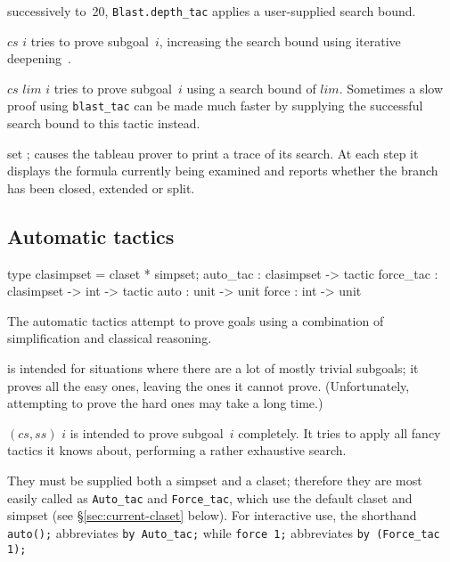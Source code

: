 successively to~20, \texttt{Blast.depth_tac} applies a user-supplied search bound.
\begin{ttdescription}
\item[\ttindexbold{blast_tac} $cs$ $i$] tries to prove
  subgoal~$i$, increasing the search bound using iterative
  deepening~\cite{korf85}. 
  
\item[\ttindexbold{Blast.depth_tac} $cs$ $lim$ $i$] tries
  to prove subgoal~$i$ using a search bound of $lim$.  Sometimes a slow
  proof using \texttt{blast_tac} can be made much faster by supplying the
  successful search bound to this tactic instead.
  
\item[set \ttindexbold{Blast.trace};] 
  causes the tableau prover to print a trace of its search.  At each step it
  displays the formula currently being examined and reports whether the branch
  has been closed, extended or split.
\end{ttdescription}


\subsection{Automatic tactics}\label{sec:automatic-tactics}
\begin{ttbox} 
type clasimpset = claset * simpset;
auto_tac        : clasimpset ->        tactic
force_tac       : clasimpset -> int -> tactic
auto            : unit -> unit
force           : int  -> unit
\end{ttbox}
The automatic tactics attempt to prove goals using a combination of
simplification and classical reasoning. 
\begin{ttdescription}
\item[\ttindexbold{auto_tac $(cs,ss)$}] is intended for situations where 
there are a lot of mostly trivial subgoals; it proves all the easy ones, 
leaving the ones it cannot prove.
(Unfortunately, attempting to prove the hard ones may take a long time.)  
\item[\ttindexbold{force_tac} $(cs,ss)$ $i$] is intended to prove subgoal~$i$ 
completely. It tries to apply all fancy tactics it knows about, 
performing a rather exhaustive search.
\end{ttdescription}
They must be supplied both a simpset and a claset; therefore 
they are most easily called as \texttt{Auto_tac} and \texttt{Force_tac}, which 
use the default claset and simpset (see {\S}\ref{sec:current-claset} below). 
For interactive use, 
the shorthand \texttt{auto();} abbreviates \texttt{by Auto_tac;} 
while \texttt{force 1;} abbreviates \texttt{by (Force_tac 1);}


